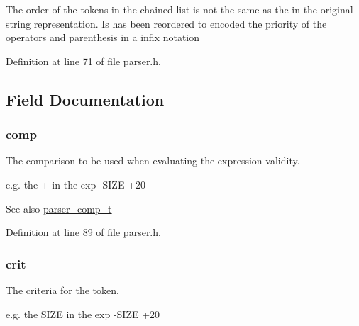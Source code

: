 The order of the tokens in the chained list is not the same as the in the original string representation. Is has been reordered to encoded the priority of the operators and parenthesis in a infix notation 

Definition at line 71 of file parser.\+h.



\subsection{Field Documentation}
\subsubsection[{\texorpdfstring{comp}{comp}}]{ comp}\hypertarget{structparser__t_a7bc05cec4ebb98215d11f1f354450f3d}{}\label{structparser__t_a7bc05cec4ebb98215d11f1f354450f3d}


The comparison to be used when evaluating the expression validity. 


\begin{DoxyItemize}
\item e.\+g. the {\ttfamily +} in the exp {\ttfamily -\/\+S\+I\+ZE +20}
\end{DoxyItemize}

\begin{DoxySeeAlso}{See also}
\hyperlink{parser_8h_ac721d0db2049edef01e62a2e63ff0472}{parser\+\_\+comp\+\_\+t} 
\end{DoxySeeAlso}


Definition at line 89 of file parser.\+h.

\subsubsection[{\texorpdfstring{crit}{crit}}]{ crit}\hypertarget{structparser__t_af8e04406eee9097a92118be27b07eff7}{}\label{structparser__t_af8e04406eee9097a92118be27b07eff7}


The criteria for the token. 


\begin{DoxyItemize}
\item e.\+g. the {\ttfamily S\+I\+ZE} in the exp {\ttfamily -\/\+S\+I\+ZE +20}
\end{DoxyItemize}

